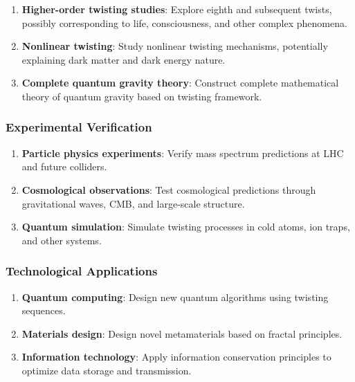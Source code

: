 \documentclass[11pt]{article}
\begin{document}
\begin{enumerate}
\item \textbf{Higher-order twisting studies}: Explore eighth and subsequent twists, possibly corresponding to life, consciousness, and other complex phenomena.

\item \textbf{Nonlinear twisting}: Study nonlinear twisting mechanisms, potentially explaining dark matter and dark energy nature.

\item \textbf{Complete quantum gravity theory}: Construct complete mathematical theory of quantum gravity based on twisting framework.
\end{enumerate}

\subsubsection{Experimental Verification}

\begin{enumerate}
\item \textbf{Particle physics experiments}: Verify mass spectrum predictions at LHC and future colliders.

\item \textbf{Cosmological observations}: Test cosmological predictions through gravitational waves, CMB, and large-scale structure.

\item \textbf{Quantum simulation}: Simulate twisting processes in cold atoms, ion traps, and other systems.
\end{enumerate}

\subsubsection{Technological Applications}

\begin{enumerate}
\item \textbf{Quantum computing}: Design new quantum algorithms using twisting sequences.

\item \textbf{Materials design}: Design novel metamaterials based on fractal principles.

\item \textbf{Information technology}: Apply information conservation principles to optimize data storage and transmission.
\end{enumerate}
\end{document}
